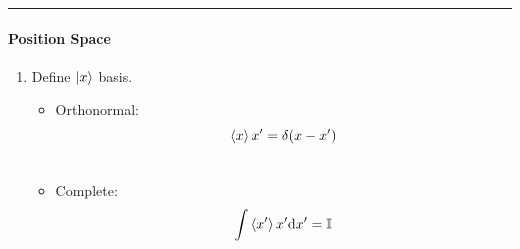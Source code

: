 \documentclass[letterpaper,10pt,english]{sphinxmanual}
\def\d{{\rm d}}
\begin{document}
\bigskip\hrule{}\bigskip



\paragraph{Position Space}
\label{QuantumMechanics:position-space}\begin{enumerate}
\item {} 
Define $\ket{x}$ basis.
\begin{itemize}
\item {} 
Orthonormal:
\begin{gather}
\begin{split}\braket{x}{x'}=\delta(x-x')\end{split}\notag\\\begin{split}\end{split}\notag
\end{gather}
\item {} 
Complete:
\begin{gather}
\begin{split}\int \braket{x'}{x'} \d x' = \mathbb{I}\end{split}\notag\\\begin{split}\end{split}\notag
\end{gather}
\end{itemize}


\end{enumerate}
\end{document}
